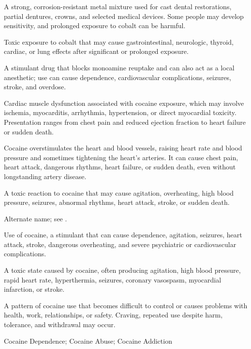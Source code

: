  A strong, corrosion-resistant metal mixture used for cast dental restorations, partial dentures, crowns, and selected medical devices. Some people may develop sensitivity, and prolonged exposure to cobalt can be harmful.

 Toxic exposure to cobalt that may cause gastrointestinal, neurologic, thyroid, cardiac, or lung effects after significant or prolonged exposure.

 A stimulant drug that blocks monoamine reuptake and can also act as a local anesthetic; use can cause dependence, cardiovascular complications, seizures, stroke, and overdose.

 Cardiac muscle dysfunction associated with cocaine exposure, which may involve ischemia, myocarditis, arrhythmia, hypertension, or direct myocardial toxicity. Presentation ranges from chest pain and reduced ejection fraction to heart failure or sudden death.

 Cocaine overstimulates the heart and blood vessels, raising heart rate and blood pressure and sometimes tightening the heart's arteries. It can cause chest pain, heart attack, dangerous rhythms, heart failure, or sudden death, even without longstanding artery disease.

 A toxic reaction to cocaine that may cause agitation, overheating, high blood pressure, seizures, abnormal rhythms, heart attack, stroke, or sudden death.

 Alternate name; see .

 Use of cocaine, a stimulant that can cause dependence, agitation, seizures, heart attack, stroke, dangerous overheating, and severe psychiatric or cardiovascular complications.

 A toxic state caused by cocaine, often producing agitation, high blood pressure, rapid heart
rate, hyperthermia, seizures, coronary vasospasm, myocardial infarction, or stroke.

 A pattern of cocaine use that becomes difficult to control or causes problems with health, work, relationships, or safety. Craving, repeated use despite harm, tolerance, and withdrawal may occur.

\synonyms
Cocaine Dependence; Cocaine Abuse; Cocaine Addiction

